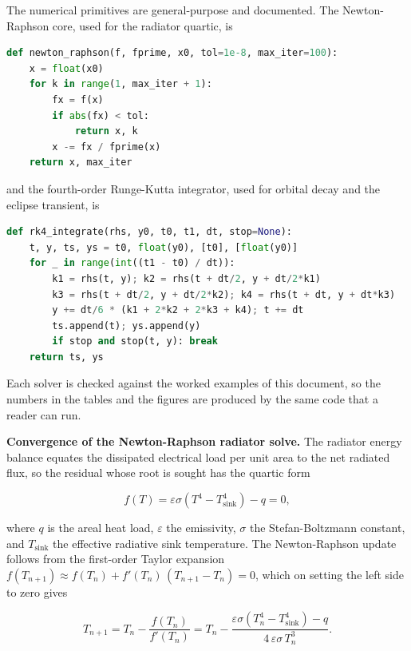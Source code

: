 \documentclass[
  11pt,
  openany,
  oneside]{book}
\begin{document}
The numerical primitives are general-purpose and documented. The
Newton-Raphson core, used for the radiator quartic, is

\begin{lstlisting}[language=Python]
def newton_raphson(f, fprime, x0, tol=1e-8, max_iter=100):
    x = float(x0)
    for k in range(1, max_iter + 1):
        fx = f(x)
        if abs(fx) < tol:
            return x, k
        x -= fx / fprime(x)
    return x, max_iter
\end{lstlisting}

and the fourth-order Runge-Kutta integrator, used for orbital decay and
the eclipse transient, is

\begin{lstlisting}[language=Python]
def rk4_integrate(rhs, y0, t0, t1, dt, stop=None):
    t, y, ts, ys = t0, float(y0), [t0], [float(y0)]
    for _ in range(int((t1 - t0) / dt)):
        k1 = rhs(t, y); k2 = rhs(t + dt/2, y + dt/2*k1)
        k3 = rhs(t + dt/2, y + dt/2*k2); k4 = rhs(t + dt, y + dt*k3)
        y += dt/6 * (k1 + 2*k2 + 2*k3 + k4); t += dt
        ts.append(t); ys.append(y)
        if stop and stop(t, y): break
    return ts, ys
\end{lstlisting}

Each solver is checked against the worked examples of this document, so
the numbers in the tables and the figures are produced by the same code
that a reader can run.

\textbf{Convergence of the Newton-Raphson radiator solve.} The radiator
energy balance equates the dissipated electrical load per unit area to
the net radiated flux, so the residual whose root is sought has the
quartic form

\begin{equation}
f(T) = \varepsilon \sigma \left( T^4 - T_{\mathrm{sink}}^4 \right) - q = 0, \tag{18A.1}
\end{equation}

where \(q\) is the areal heat load, \(\varepsilon\) the emissivity,
\(\sigma\) the Stefan-Boltzmann constant, and \(T_{\mathrm{sink}}\) the
effective radiative sink temperature. The Newton-Raphson update follows
from the first-order Taylor expansion
\(f(T_{n+1}) \approx f(T_n) + f'(T_n)\,(T_{n+1}-T_n)=0\), which on
setting the left side to zero gives

\begin{equation}
T_{n+1} = T_n - \frac{f(T_n)}{f'(T_n)} = T_n - \frac{\varepsilon \sigma (T_n^4 - T_{\mathrm{sink}}^4) - q}{4\,\varepsilon \sigma\, T_n^3}. \tag{18A.2}
\end{equation}
\end{document}
